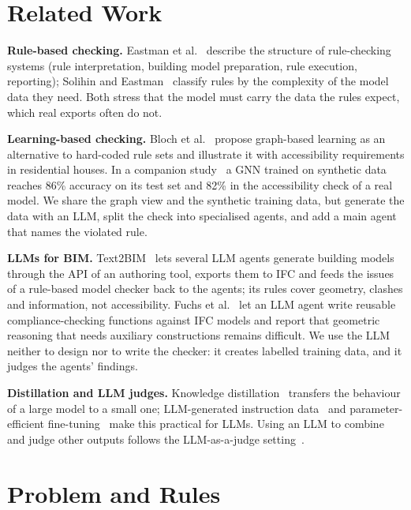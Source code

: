 \documentclass[conference]{IEEEtran}
\begin{document}
\section{Related Work}

\textbf{Rule-based checking.} Eastman et al.~\cite{eastman2009} describe the structure of rule-checking systems
(rule interpretation, building model preparation, rule execution, reporting); Solihin and
Eastman~\cite{solihin2015} classify rules by the complexity of the model data they need. Both stress that the
model must carry the data the rules expect, which real exports often do not.

\textbf{Learning-based checking.} Bloch et al.~\cite{bloch2023aei} propose graph-based learning as an alternative
to hard-coded rule sets and illustrate it with accessibility requirements in residential houses. In a companion
study~\cite{bloch2023icccbe} a GNN trained on synthetic data reaches 86\% accuracy on its test set and 82\% in the
accessibility check of a real model. We share the graph view and the synthetic training data, but generate the data
with an LLM, split the check into specialised agents, and add a main agent that names the violated rule.

\textbf{LLMs for BIM.} Text2BIM~\cite{du2024text2bim} lets several LLM agents generate building models through the
API of an authoring tool, exports them to IFC and feeds the issues of a rule-based model checker back to the
agents; its rules cover geometry, clashes and information, not accessibility. Fuchs et al.~\cite{fuchs2026} let an
LLM agent write reusable compliance-checking functions against IFC models and report that geometric reasoning that
needs auxiliary constructions remains difficult. We use the LLM neither to design nor to write the checker: it
creates labelled training data, and it judges the agents' findings.

\textbf{Distillation and LLM judges.} Knowledge distillation~\cite{hinton2015} transfers the behaviour of a large
model to a small one; LLM-generated instruction data~\cite{wang2023selfinstruct} and parameter-efficient
fine-tuning~\cite{hu2022lora,dettmers2023qlora} make this practical for LLMs. Using an LLM to combine and judge
other outputs follows the LLM-as-a-judge setting~\cite{zheng2023judge}.

\section{Problem and Rules}
\end{document}
